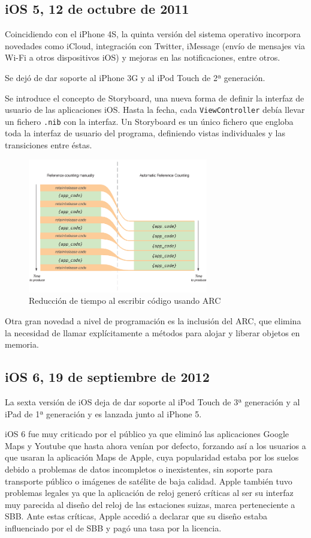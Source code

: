 \subsection{iOS 5, 12 de octubre de 2011}
Coincidiendo con el iPhone 4S, la quinta versión del sistema operativo incorpora novedades como iCloud, integración con Twitter, iMessage (envío de mensajes via Wi-Fi a otros dispositivos iOS) y mejoras en las notificaciones, entre otros.

Se dejó de dar soporte al iPhone 3G y al iPod Touch de 2ª generación.

Se introduce el concepto de Storyboard, una nueva forma de definir la interfaz de usuario de las aplicaciones iOS. Hasta la fecha, cada \texttt{ViewController} debía llevar un fichero \texttt{.nib} con la interfaz. Un Storyboard es un único fichero que engloba toda la interfaz de usuario del programa, definiendo vistas individuales y las transiciones entre éstas.

\begin{figure}[h]
	\centering
		\includegraphics[width=0.7\textwidth]{./img/ARC.png}
	\caption{Reducción de tiempo al escribir código usando ARC}
\end{figure}

Otra gran novedad a nivel de programación es la inclusión del ARC, que elimina la necesidad de llamar explícitamente a métodos para alojar y liberar objetos en memoria.

\subsection{iOS 6, 19 de septiembre de 2012}
La sexta versión de iOS deja de dar soporte al iPod Touch de 3ª generación y al iPad de 1ª generación y es lanzada junto al iPhone 5.

iOS 6 fue muy criticado por el público ya que eliminó las aplicaciones Google Maps y Youtube que hasta ahora venían por defecto, forzando así a los usuarios a que usaran la aplicación Maps de Apple, cuya popularidad estaba por los suelos debido a problemas de datos incompletos o inexistentes, sin soporte para transporte público o imágenes de satélite de baja calidad. Apple también tuvo problemas legales ya que la aplicación de reloj generó críticas al ser su interfaz muy parecida al diseño del reloj de las estaciones suizas, marca perteneciente a SBB. Ante estas críticas, Apple accedió a declarar que su diseño estaba influenciado por el de SBB y pagó una tasa por la licencia. 

